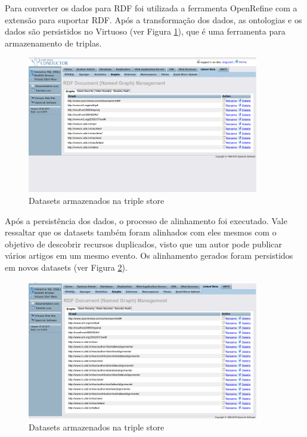 Para converter os dados para RDF foi utilizada a ferramenta OpenRefine com a extensão para suportar RDF. Após a transformação dos dados, as ontologias e os dados são persistidos no Virtuoso (ver Figura \ref{fig:datasets}), que é uma ferramenta para armazenamento de triplas.

\begin{figure}[!ht]
	\centering
	\includegraphics[width=0.9\textwidth]{./imagens/datasets.png}
    \caption{Datasets armazenados na triple store}
	\label{fig:datasets}
\end{figure}

Após a persistência dos dados, o processo de alinhamento foi executado. Vale ressaltar que os datasets também foram alinhados com eles mesmos com o objetivo de descobrir recursos duplicados, visto que um autor pode publicar vários artigos em um mesmo evento. Os alinhamento gerados foram persistidos em novos datasets (ver Figura \ref{fig:datasets_alingments}).

\begin{figure}[!ht]
	\centering
	\includegraphics[width=0.9\textwidth]{./imagens/datasets-alinhamento.png}
    \caption{Datasets armazenados na triple store}
	\label{fig:datasets_alingments}
\end{figure}

